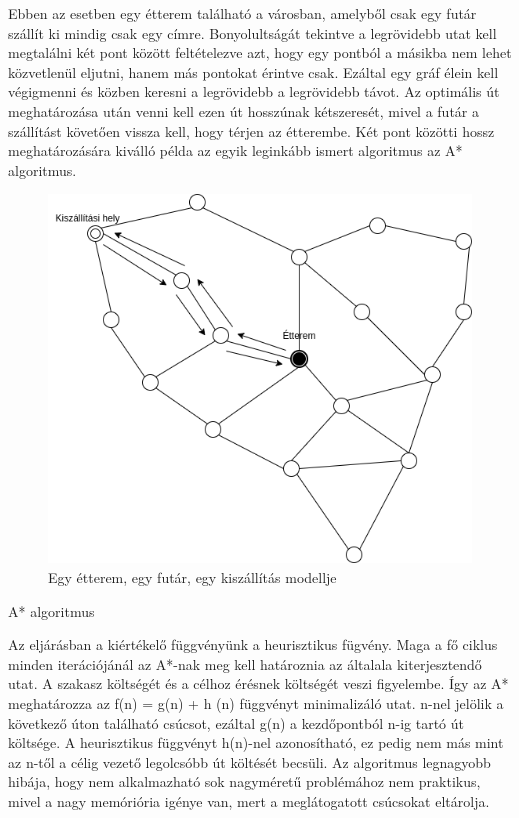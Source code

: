 

Ebben az esetben egy étterem található a városban, amelyből csak egy futár szállít ki mindig csak egy címre.
Bonyolultságát tekintve a legrövidebb utat kell megtalálni két pont között feltételezve azt, hogy egy pontból a másikba nem lehet közvetlenül eljutni, hanem más pontokat érintve csak. Ezáltal egy gráf élein kell végigmenni és közben keresni a legrövidebb a legrövidebb távot. Az optimális út meghatározása után venni kell ezen út hosszúnak kétszeresét, mivel a futár a szállítást követően vissza kell, hogy térjen az étterembe. Két pont közötti hossz meghatározására kiválló példa az egyik leginkább ismert algoritmus az A* algoritmus.

\begin{figure}[h!]
\centering
\includegraphics[scale=0.5]{images/Astar.png}
\caption{Egy étterem, egy futár, egy kiszállítás modellje}
\label{fig:model1}
\end{figure}


A* algoritmus

Az eljárásban a kiértékelő függvényünk a heurisztikus fügvény. Maga a fő ciklus minden iterációjánál az A*-nak meg kell határoznia az általala kiterjesztendő utat. A szakasz költségét és a célhoz érésnek költségét veszi figyelembe. Így az A* meghatározza az f(n) = g(n) + h (n) függvényt minimalizáló utat. n-nel jelölik a következő úton található csúcsot, ezáltal g(n) a kezdőpontból n-ig tartó út költsége. A heurisztikus függvényt h(n)-nel azonosítható, ez pedig nem más mint az n-től a célig vezető legolcsóbb út költését becsüli.
Az algoritmus legnagyobb hibája, hogy nem alkalmazható sok nagyméretű problémához nem praktikus, mivel a nagy memóriória igénye van, mert a meglátogatott csúcsokat eltárolja.

